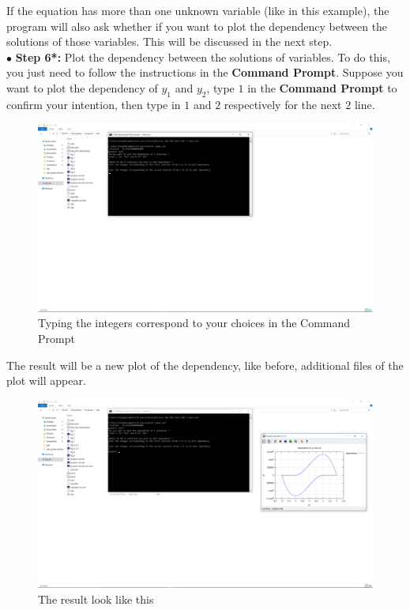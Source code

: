 \documentclass{article}
\begin{document}
	\noindent If the equation has more than one unknown variable (like in this example), the program will also ask whether if you want to plot the dependency between the solutions of those variables. This will be discussed in the next step.\\
	\noindent$\bullet$ \textbf{Step 6*:} Plot the dependency between the solutions of variables. To do this, you just need to follow the instructions in the \textbf{Command Prompt}. Suppose you want to plot the dependency of $y_1$ and $y_2$, type $1$ in the \textbf{Command Prompt} to confirm your intention, then type in $1$ and $2$ respectively for the next $2$ line.\\
	\begin{figure}[H]
		\centering	\includegraphics[width=15cm]{fig9}
		\caption{Typing the integers correspond to your choices in the Command Prompt}
	\end{figure}
	\noindent The result will be a new plot of the dependency, like before, additional files of the plot will appear.
	\begin{figure}[H]
		\centering	\includegraphics[width=15cm]{fig10}
		\caption{The result look like this}
	\end{figure}
\end{document}
